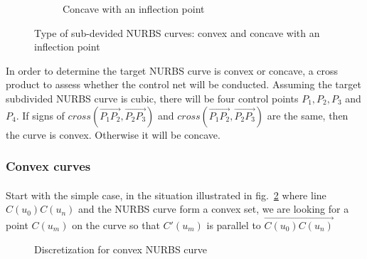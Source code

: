 \begin{figure}
\begin{subfigure}[b]{0.5\linewidth}
{            }
            \caption{Concave with an inflection point}
        \end{subfigure}
    \caption{Type of sub-devided NURBS curves: convex and concave with an inflection point}
    \label{qt_fig:iges_chord_ratio_nurbs}
    \end{figure}

In order to determine the target NURBS curve is convex or concave, a cross product to assess whether the control net will be conducted.
Assuming the target subdivided NURBS curve is cubic, there will be four control points $P_1,P_2,P_3$ and $P_4$.
If signs of $cross(\overrightarrow{P_1P_2},\overrightarrow{P_2P_3})$ and $cross(\overrightarrow{P_1P_2},\overrightarrow{P_2P_3})$ are the same, then the curve is convex. Otherwise it will be concave.

\subsubsection{Convex curves}
\label{qt_ssc:convex_curves}
\paragraph{}
Start with the simple case, in the situation illustrated in fig.~\ref{qt_fig:iges_chord_split_convex_sum} where line $C(u_0)C(u_n)$ and the NURBS curve form a convex set, we are looking for a point $C(u_m)$ on the curve so that $C'(u_m)$ is parallel to $\overrightarrow{C(u_0)C(u_n)}$
    \begin{figure}[h!]
        \centering
        \caption{Discretization for convex NURBS curve}
        \label{qt_fig:iges_chord_split_convex_sum}
    \end{figure}

